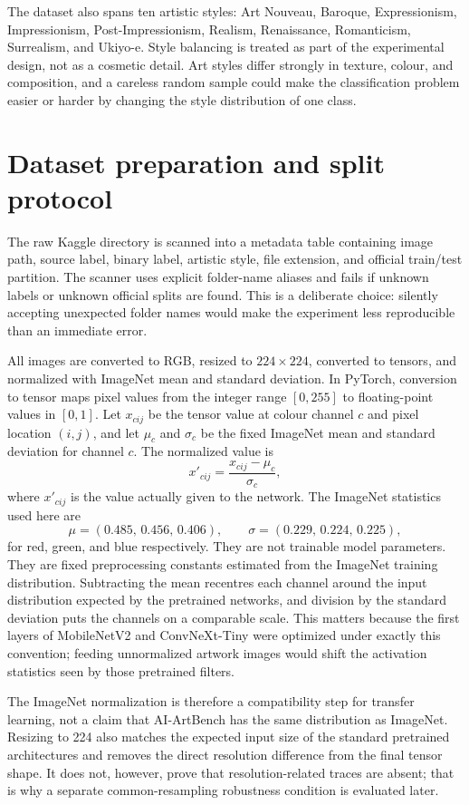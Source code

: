 \documentclass[11pt,a4paper]{article}
\begin{document}
The dataset also spans ten artistic styles: Art Nouveau, Baroque,
Expressionism, Impressionism, Post-Impressionism, Realism, Renaissance,
Romanticism, Surrealism, and Ukiyo-e. Style balancing is treated as part of the
experimental design, not as a cosmetic detail. Art styles differ strongly in
texture, colour, and composition, and a careless random sample could make the
classification problem easier or harder by changing the style distribution of
one class.

\section{Dataset preparation and split protocol}

The raw Kaggle directory is scanned into a metadata table containing image
path, source label, binary label, artistic style, file extension, and official
train/test partition. The scanner uses explicit folder-name aliases and fails
if unknown labels or unknown official splits are found. This is a deliberate
choice: silently accepting unexpected folder names would make the experiment
less reproducible than an immediate error.

All images are converted to RGB, resized to \(224\times224\), converted to
tensors, and normalized with ImageNet \cite{deng2009imagenet} mean and standard
deviation. In PyTorch, conversion to tensor maps pixel values from the integer
range \([0,255]\) to floating-point values in \([0,1]\). Let \(x_{cij}\) be the
tensor value at colour channel \(c\) and pixel location \((i,j)\), and let
\(\mu_c\) and \(\sigma_c\) be the fixed ImageNet mean and standard deviation
for channel \(c\). The normalized value is
\[
  x'_{cij} = \frac{x_{cij}-\mu_c}{\sigma_c},
\]
where \(x'_{cij}\) is the value actually given to the network. The ImageNet
statistics used here are
\[
  \mu=(0.485,\,0.456,\,0.406), \qquad
  \sigma=(0.229,\,0.224,\,0.225),
\]
for red, green, and blue respectively. They are not trainable model
parameters. They are fixed preprocessing constants estimated from the ImageNet
training distribution. Subtracting the mean recentres each channel around the
input distribution expected by the pretrained networks, and division by the
standard deviation puts the channels on a comparable scale. This matters
because the first layers of MobileNetV2 and ConvNeXt-Tiny were optimized under
exactly this convention; feeding unnormalized artwork images would shift the
activation statistics seen by those pretrained filters.

The ImageNet normalization is therefore a compatibility step for transfer
learning, not a claim that AI-ArtBench has the same distribution as ImageNet.
Resizing to 224 also matches the expected input size of the standard
pretrained architectures and removes the direct resolution difference from the
final tensor shape. It does not, however, prove that resolution-related traces
are absent; that is why a separate common-resampling robustness condition is
evaluated later.
\end{document}
